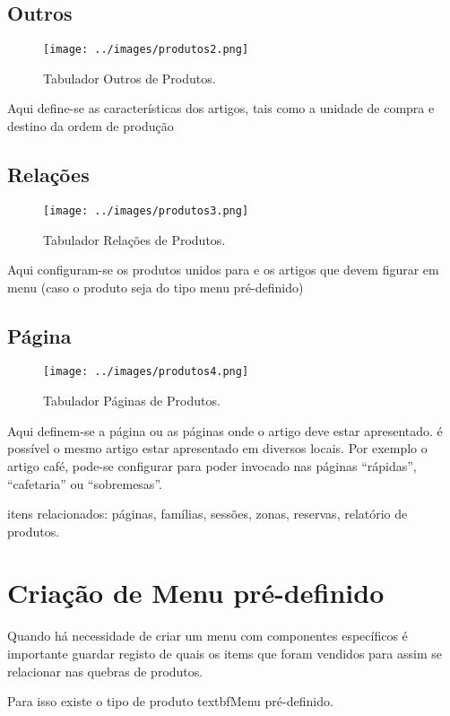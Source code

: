 \documentclass[a4paper,11pt,openany]{memoir}
\begin{document}
\subsection{Outros}
\begin{figure}
\texttt{[image: ../images/produtos2.png]}
\caption[Submanifold]{Tabulador Outros de Produtos.}
\end{figure}


Aqui define-se as características dos artigos, tais como a unidade de compra e destino da ordem de produção

\subsection{Relações}
\begin{figure}
\texttt{[image: ../images/produtos3.png]}
\caption[Submanifold]{Tabulador Relações de Produtos.}
\end{figure}


Aqui configuram-se os produtos unidos para e os artigos que devem figurar em menu (caso o produto seja do tipo menu pré-definido)

\subsection{Página}
\begin{figure}
\texttt{[image: ../images/produtos4.png]}
\caption[Submanifold]{Tabulador Páginas de Produtos.}
\end{figure}


Aqui definem-se a página ou as páginas onde o artigo deve estar apresentado.
é possível o mesmo artigo estar apresentado em diversos locais. Por exemplo o artigo café, pode-se configurar para poder invocado nas páginas “rápidas”, “cafetaria” ou “sobremesas”.

itens relacionados: páginas, famílias, sessões, zonas, reservas, relatório de produtos.

\section{Criação de Menu pré-definido}

Quando há necessidade de criar um menu com componentes específicos é importante guardar registo de quais os items que foram vendidos para assim se relacionar 
nas quebras de produtos.

Para isso existe o tipo de produto textbf{Menu pré-definido}.
\end{document}
